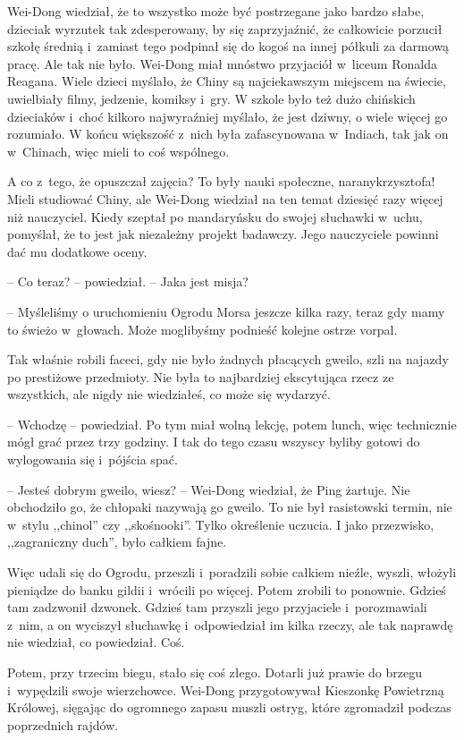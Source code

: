 \documentclass[oneside,polish,11pt,rmheadings]{mwbk}
\begin{document}
Wei-Dong wiedział, że to wszystko może być postrzegane jako bardzo słabe, dzieciak wyrzutek tak zdesperowany, by się zaprzyjaźnić, że całkowicie porzucił szkołę średnią i~zamiast tego podpinał się do kogoś na innej półkuli za darmową pracę. Ale tak nie było. Wei-Dong miał mnóstwo przyjaciół w~liceum Ronalda Reagana. Wiele dzieci myślało, że Chiny są najciekawszym miejscem na świecie, uwielbiały filmy, jedzenie, komiksy i~gry. W szkole było też dużo chińskich dzieciaków i~choć kilkoro najwyraźniej myślało, że jest dziwny, o wiele więcej go rozumiało. W końcu większość z~nich była zafascynowana w~Indiach, tak jak on w~Chinach, więc mieli to coś wspólnego. 


A co z~tego, że opuszczał zajęcia? To były nauki społeczne, naranykrzysztofa! Mieli studiować Chiny, ale Wei-Dong wiedział na ten temat dziesięć razy więcej niż nauczyciel. Kiedy szeptał po mandaryńsku do swojej słuchawki w~uchu, pomyślał, że to jest jak niezależny projekt badawczy. Jego nauczyciele powinni dać mu dodatkowe oceny. 


-- Co teraz? -- powiedział. -- Jaka jest misja?  


-- Myśleliśmy o uruchomieniu Ogrodu Morsa jeszcze kilka razy, teraz gdy mamy to świeżo w~głowach. Może moglibyśmy podnieść kolejne ostrze vorpal. 

Tak właśnie robili faceci, gdy nie było żadnych płacących gweilo, szli na najazdy po prestiżowe przedmioty. Nie była to najbardziej ekscytująca rzecz ze wszystkich, ale nigdy nie wiedziałeś, co może się wydarzyć. 


-- Wchodzę -- powiedział. Po tym miał wolną lekcję, potem lunch, więc technicznie mógł grać przez trzy godziny. I tak do tego czasu wszyscy byliby gotowi do wylogowania się i~pójścia spać. 


-- Jesteś dobrym gweilo, wiesz? -- Wei-Dong wiedział, że Ping żartuje. Nie obchodziło go, że chłopaki nazywają go gweilo. To nie był rasistowski termin, nie w~stylu ,,chinol'' czy ,,skośnooki''. Tylko określenie uczucia. I jako przezwisko, ,,zagraniczny duch'', było całkiem fajne. 


Więc udali się do Ogrodu, przeszli i~poradzili sobie całkiem nieźle, wyszli, włożyli pieniądze do banku gildii i~wrócili po więcej. Potem zrobili to ponownie. Gdzieś tam zadzwonił dzwonek. Gdzieś tam przyszli jego przyjaciele i~porozmawiali z~nim, a on wyciszył słuchawkę i~odpowiedział im kilka rzeczy, ale tak naprawdę nie wiedział, co powiedział. Coś. 


Potem, przy trzecim biegu, stało się coś złego. Dotarli już prawie do brzegu i~wypędzili swoje wierzchowce. Wei-Dong przygotowywał Kieszonkę Powietrzną Królowej, sięgając do ogromnego zapasu muszli ostryg, które zgromadził podczas poprzednich rajdów. 
\end{document}
